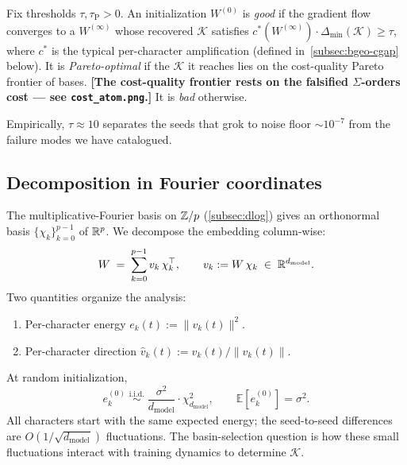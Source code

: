 \begin{definition}
\label{def:bgeo-good-init}
Fix thresholds $\tau, \tau_{\text{P}} > 0$.  An initialization
$W^{(0)}$ is
\emph{good} if the gradient flow converges to a $W^{(\infty)}$ whose
recovered $\mathcal K$ satisfies $c^*(W^{(\infty)}) \cdot \Delta_{\min}(\mathcal K) \geq \tau$,
where $c^*$ is the typical per-character amplification (defined
in~\cref{subsec:bgeo-cgap} below).  {\color{red}It is \emph{Pareto-optimal} if the
$\mathcal K$ it reaches lies on the cost-quality Pareto frontier of
bases. \textbf{[The cost-quality frontier rests on the falsified $\Sigma$-orders cost --- see \texttt{cost\_atom.png}.]}}  It is \emph{bad} otherwise.
\end{definition}

Empirically, $\tau \approx 10$ separates the seeds that grok to noise floor
$\sim 10^{-7}$ from the failure modes we have catalogued.

\subsection{Decomposition in Fourier coordinates}
\label{subsec:bgeo-fourier}

The multiplicative-Fourier basis on $\mathbb{Z}/p$ (\cref{subsec:dlog}) gives an
orthonormal basis $\{\chi_k\}_{k=0}^{p-1}$ of $\mathbb{R}^p$.  We decompose the
embedding column-wise:
\begin{equation}
  W \;=\; \sum_{k=0}^{p-1} v_k \,\chi_k^\top,
  \qquad v_k := W\,\chi_k \;\in\; \mathbb{R}^{d_{\text{model}}}.
  \label{eq:bgeo-fourier-decomp}
\end{equation}
Two quantities organize the analysis:
\begin{enumerate}[leftmargin=*]
  \item Per-character energy $e_k(t) := \|v_k(t)\|^2$.
  \item Per-character direction $\hat v_k(t) := v_k(t) / \|v_k(t)\|$.
\end{enumerate}
At random initialization,
\begin{equation}
  e_k^{(0)} \;\overset{\mathrm{i.i.d.}}{\sim}\;
  \frac{\sigma^2}{d_{\text{model}}}\cdot \chi^2_{d_{\text{model}}},
  \qquad \mathbb{E}[e_k^{(0)}] = \sigma^2.
  \label{eq:bgeo-init-stats}
\end{equation}
All characters start with the same expected energy; the seed-to-seed
differences are $O(1/\sqrt{d_{\text{model}}})$ fluctuations.  The
basin-selection question is how these small fluctuations interact with
training dynamics to determine $\mathcal K$.

